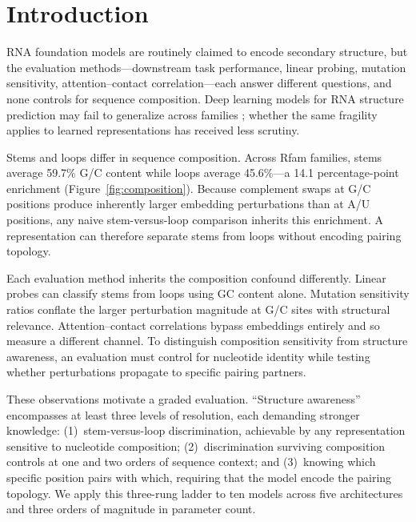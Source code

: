 \documentclass[11pt]{article}
\begin{document}
\section{Introduction}
\label{sec:intro}

RNA foundation models are routinely claimed to encode secondary structure,
but the evaluation methods---downstream task performance, linear probing,
mutation sensitivity, attention--contact correlation---each answer different
questions, and none controls for sequence composition. Deep learning models
for RNA structure prediction may fail to generalize across families
\citep{szikszai2022generalization}; whether the same fragility applies to
learned representations has received less scrutiny.

Stems and loops differ in sequence composition. Across \panelN{} Rfam families,
stems average 59.7\% G/C content while loops average 45.6\%---a 14.1
percentage-point enrichment (Figure~\ref{fig:composition}). Because complement swaps at G/C positions
produce inherently larger embedding perturbations than at A/U positions,
any naive stem-versus-loop comparison inherits this enrichment. A
representation can therefore separate stems from loops without encoding
pairing topology.

Each evaluation method inherits the composition confound differently.
Linear probes can classify stems from loops using GC content alone.
Mutation sensitivity ratios conflate the larger perturbation magnitude at
G/C sites with structural relevance. Attention--contact correlations
bypass embeddings entirely and so measure a different channel. To
distinguish composition sensitivity from structure awareness, an
evaluation must control for nucleotide identity while testing whether
perturbations propagate to specific pairing partners.

These observations motivate a graded evaluation.
``Structure awareness'' encompasses at least three levels of
resolution, each demanding stronger knowledge: (1)~stem-versus-loop
discrimination, achievable by any representation sensitive to
nucleotide composition; (2)~discrimination surviving composition
controls at one and two orders of sequence context; and (3)~knowing
which specific position pairs with which, requiring that the model
encode the pairing topology. We apply this three-rung ladder to ten models across five architectures
and three orders of magnitude in parameter count.
\end{document}
